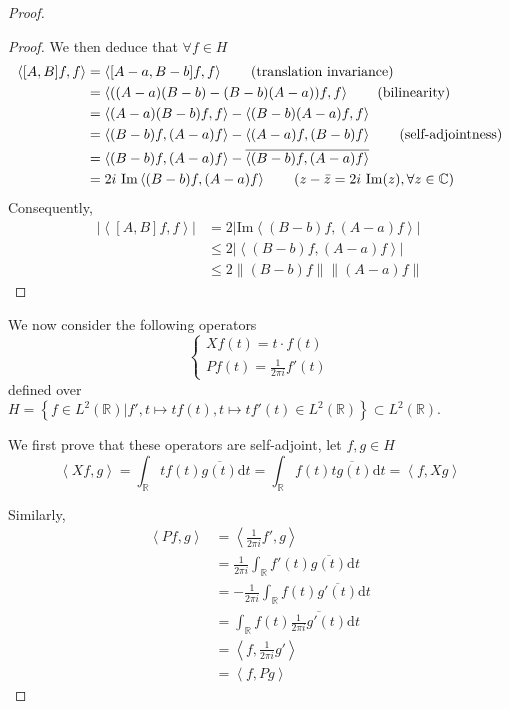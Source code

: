 \documentclass[
  american,
]{article}
\begin{document}
\begin{proof}
\begin{proof}
We then deduce that \(\forall f\in H\)
\begin{align*}
\left\langle[A,B]f,f\right\rangle &= \left\langle[A-a,B-b]f,f\right\rangle \tag{translation invariance}\\
    &= \left\langle((A-a)(B-b)-(B-b)(A-a))f,f\right\rangle \tag{bilinearity}\\
    &= \left\langle(A-a)(B-b)f,f\right\rangle - \left\langle(B-b)(A-a)f,f\right\rangle\\
    &= \left\langle(B-b)f,(A-a)f\right\rangle - \left\langle(A-a)f,(B-b)f\right\rangle \tag{self-adjointness}\\
    &= \left\langle(B-b)f,(A-a)f\right\rangle - \overline{\left\langle(B-b)f,(A-a)f\right\rangle}\\
    &= 2i~\mathrm{Im}\left\langle(B-b)f,(A-a)f\right\rangle \tag{$z-\bar z = 2i~\mathrm{Im}(z),\forall z\in\mathbb{C}$}
\end{align*}
Consequently,
\begin{align*}
\left\lvert\left\langle[A,B]f,f\right\rangle\right\rvert &= 2\left\lvert\mathrm{Im}\left\langle(B-b)f,(A-a)f\right\rangle\right\rvert\\
    &\leq 2\left\lvert\left\langle(B-b)f,(A-a)f\right\rangle\right\rvert\\
    &\leq 2\left\lVert(B-b)f\right\rVert\left\lVert(A-a)f\right\rVert \tag{Cauchy-Schwartz inequality}
\end{align*}
\end{proof}

We now consider the following operators
\begin{equation} 
\begin{cases}
Xf(t) = t\cdot f(t)\\
Pf(t) = \frac{1}{2\pi i}f'(t)
\end{cases}
\end{equation}
defined over
\(H=\left\{f\in L^2(\mathbb{R})\vert f', t\mapsto tf(t),t\mapsto tf'(t)\in L^2(\mathbb{R})\right\}\subset L^2(\mathbb{R})\).

We first prove that these operators are self-adjoint, let \(f,g\in H\)
\begin{equation} 
\left\langle Xf,g\right\rangle =\int_\mathbb{R}tf(t)\overline{g(t)}\mathrm{d}t=\int_\mathbb{R}f(t)\overline{tg(t)}\mathrm{d}t= \left\langle f,Xg\right\rangle
\end{equation}

Similarly,
\begin{align*}
\left\langle Pf,g\right\rangle &= \left\langle\frac{1}{2\pi i}f',g\right\rangle\\
    &= \frac{1}{2\pi i}\int_\mathbb{R}f'(t)\overline{g(t)}\mathrm{d}t\\
    &= -\frac{1}{2\pi i}\int_\mathbb{R}f(t)\overline{g'(t)}\mathrm{d}t\tag{integration by parts}\\
    &= \int_\mathbb{R}f(t)\overline{\frac{1}{2\pi i}g'(t)}\mathrm{d}t\\
    &= \left\langle f,\frac{1}{2\pi i}g'\right\rangle\\
    &= \left\langle f,Pg\right\rangle
\end{align*}


\end{proof}
\end{document}
